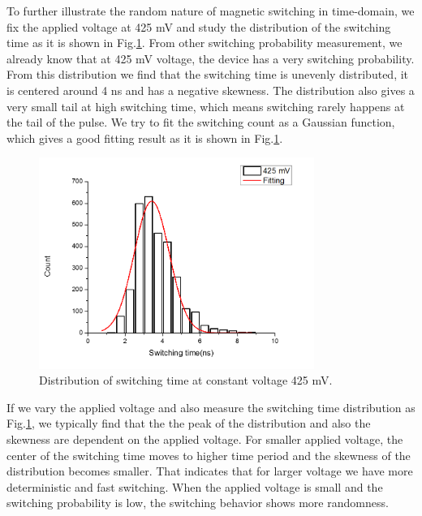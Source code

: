 To further illustrate the random nature of magnetic switching in time-domain, we fix the applied voltage at 425 mV and study the distribution of the switching time as it is shown in Fig.\ref{fig:dist}. From other switching probability measurement, we already know that at 425 mV voltage, the device has a very switching probability. From this distribution we find that the switching time is unevenly distributed, it is centered around 4 ns and has a negative skewness. The distribution also gives a very small tail at high switching time, which means switching rarely happens at the tail of the pulse. We try to fit the switching count as a Gaussian function, which gives a good fitting result as it is shown in Fig.\ref{fig:dist}.



\begin{figure}[h]
  \centering
  \includegraphics[width=0.8\textwidth]{fig/dist.png}
  \caption{Distribution of switching time at constant voltage 425 mV.}
  \label{fig:dist}
\end{figure}

If we vary the applied voltage and also measure the switching time distribution as Fig.\ref{fig:dist}, we typically find that the the peak of the distribution and also the skewness are dependent on the applied voltage. For smaller applied voltage, the center of the switching time moves to higher time period and the skewness of the distribution becomes smaller. That indicates that for larger voltage we have more deterministic and fast switching. When the applied voltage is small and the switching probability is low, the switching behavior shows more randomness.







